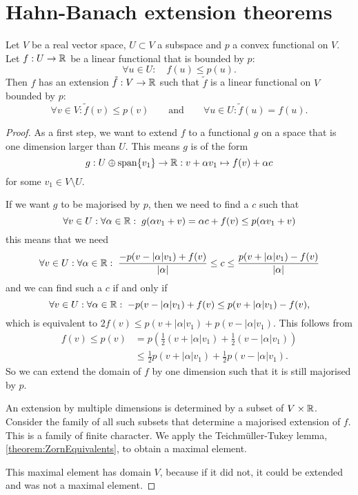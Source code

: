 \section{Hahn-Banach extension theorems}
\begin{theorem} \label{theorem:sublinearHahnBanach}
Let $V$ be a real vector space, $U\subset V$ a subspace and $p$ a convex functional on $V$. Let $f:U\to\mathbb{R}$ be a linear functional that is bounded by $p$:
\[ \forall u\in U: \quad f(u) \leq p(u). \]
Then $f$ has an extension $\tilde{f}: V\to \mathbb{R}$ such that $\tilde{f}$ is a linear functional on $V$ bounded by $p$:
\[ \forall v\in V: \tilde{f}(v) \leq p(v) \qquad \text{and} \qquad \forall u\in U: \tilde{f}(u) = f(u). \]
\end{theorem}
\begin{proof}
As a first step, we want to extend $f$ to a functional $g$ on a space that is one dimension larger than $U$. This means $g$ is of the form
\[ g: U\oplus\operatorname{span}\{v_1\}\to\mathbb{R}: v + \alpha v_1 \mapsto f(v) + \alpha c \]
for some $v_1\in V\setminus U$.

If we want $g$ to be majorised by $p$, then we need to find a $c$ such that
\[ \forall v\in U: \forall \alpha\in\mathbb{R}: \; g(\alpha v_1 + v) = \alpha c + f(v) \leq p(\alpha v_1 + v) \]
this means that we need
\[ \forall v\in U: \forall \alpha\in\mathbb{R}:\; \frac{-p(v - |\alpha|v_1) + f(v)}{|\alpha|} \leq c \leq \frac{p(v + |\alpha|v_1) - f(v)}{|\alpha|} \]
and we can find such a $c$ if and only if
\[ \forall v\in U: \forall \alpha\in\mathbb{R}:\; -p(v - |\alpha|v_1) + f(v) \leq p(v + |\alpha|v_1) - f(v), \]
which is equivalent to $2f(v) \leq p(v+|\alpha|v_1)+p(v-|\alpha|v_1)$. This follows from
\begin{align*}
f(v) \leq p(v) &= p(\tfrac{1}{2}(v+|\alpha|v_1) + \tfrac{1}{2}(v-|\alpha|v_1)) \\
&\leq \tfrac{1}{2}p(v+|\alpha|v_1) + \tfrac{1}{2}p(v-|\alpha|v_1).
\end{align*}
So we can extend the domain of $f$ by one dimension such that it is still majorised by $p$.

An extension by multiple dimensions is determined by a subset of $V\times \mathbb{R}$. Consider the family of all such subsets that determine a majorised extension of $f$. This is a family of finite character. We apply the Teichmüller-Tukey lemma, \ref{theorem:ZornEquivalents}, to obtain a maximal element.

This maximal element has domain $V$, because if it did not, it could be extended and was not a maximal element.
\end{proof}
